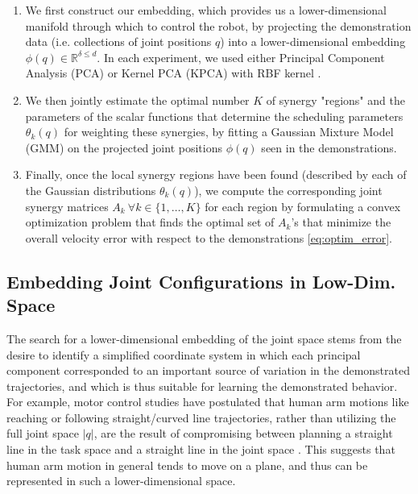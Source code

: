 \documentclass[letterpaper, 10 pt, conference,fleqn]{ieeeconf}
\begin{document}
\begin{enumerate}
\item We first construct our embedding, which provides us a lower-dimensional manifold through which to control the robot, by projecting the demonstration data (i.e. collections of joint positions $q$) into a lower-dimensional embedding $\phi(q)\in \mathbb{R}^{\delta\leq d}$. In each experiment, we used either Principal Component Analysis (PCA) \cite{jolliffe1986pca} or Kernel PCA (KPCA) with RBF kernel \cite{scholkopf1997kernel}.

\item We then jointly estimate the optimal number $K$ of synergy "regions" and the parameters of the scalar functions that determine the scheduling parameters $\theta_k(q)$ for weighting these synergies, by fitting a Gaussian Mixture Model (GMM) on the projected joint positions $\phi(q)$ seen in the demonstrations.

\item Finally, once the local synergy regions have been found (described by each of the Gaussian distributions $\theta_k(q)$), we compute the corresponding joint synergy matrices $A_k~\forall k\in\{1,\dots,K\}$ for each region by formulating a convex optimization problem that finds the optimal set of $A_k$'s that minimize the overall velocity error with respect to the demonstrations \eqref{eq:optim_error}.
\end{enumerate}

\subsection{Embedding Joint Configurations in Low-Dim. Space}
The search for a lower-dimensional embedding of the joint space stems from the desire to identify a simplified coordinate system in which each principal component corresponded to an important source of variation in the demonstrated trajectories, and which is thus suitable for learning the demonstrated behavior. For example, motor control studies have postulated that human arm motions like reaching or following straight/curved line trajectories, rather than utilizing the full joint space $|q|$, are the result of compromising between planning a straight line in the task space and a straight line in the joint space \cite{Cruse1987humanarm,Okadome1999arm}. This suggests that human arm motion in general tends to move on a plane, and thus can be represented in such a lower-dimensional space. 
\end{document}
